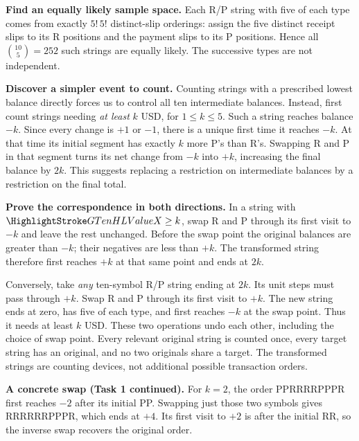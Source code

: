 \textbf{Find an equally likely sample space.} Each R/P string with five of each type comes from exactly $5!\,5!$ distinct-slip orderings: assign the five distinct receipt slips to its R positions and the payment slips to its P positions. Hence all $\binom{10}{5}=252$ such strings are equally likely. The successive types are not independent.

\textbf{Discover a simpler event to count.} Counting strings with a prescribed lowest balance directly forces us to control all ten intermediate balances. Instead, first count strings needing \emph{at least} $k$ USD, for $1\leq k\leq5$. Such a string reaches balance $-k$. Since every change is $+1$ or $-1$, there is a unique first time it reaches $-k$. At that time its initial segment has exactly $k$ more P's than R's. Swapping R and P in that segment turns its net change from $-k$ into $+k$, increasing the final balance by $2k$. This suggests replacing a restriction on intermediate balances by a restriction on the final total.

\textbf{Prove the correspondence in both directions.} In a string with $\cTwoValue{X}\geq k$, swap R and P through its first visit to $-k$ and leave the rest unchanged. Before the swap point the original balances are greater than $-k$; their negatives are less than $+k$. The transformed string therefore first reaches $+k$ at that same point and ends at $2k$.

Conversely, take \emph{any} ten-symbol R/P string ending at $2k$. Its unit steps must pass through $+k$. Swap R and P through its first visit to $+k$. The new string ends at zero, has five of each type, and first reaches $-k$ at the swap point. Thus it needs at least $k$ USD. These two operations undo each other, including the choice of swap point. Every relevant original string is counted once, every target string has an original, and no two originals share a target. The transformed strings are counting devices, not additional possible transaction orders.

\clearpage
\textbf{A concrete swap (Task 1 continued).} For $k=2$, the order PPRRRRPPPR first reaches $-2$ after its initial PP. Swapping just those two symbols gives RRRRRRPPPR, which ends at $+4$. Its first visit to $+2$ is after the initial RR, so the inverse swap recovers the original order.

